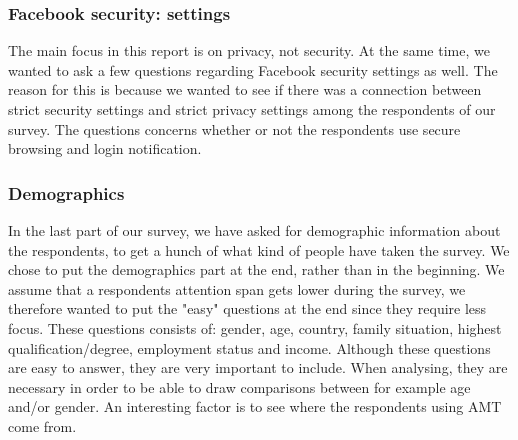 \subsubsection{Facebook security: settings}
The main focus in this report is on privacy, not security. At the same time, we wanted to ask a few questions regarding Facebook security settings as well. The reason for this is because we wanted to see if there was a connection between strict security settings and strict privacy settings among the respondents of our survey. The questions concerns whether or not the respondents use secure browsing and login notification.

\subsubsection{Demographics}
In the last part of our survey, we have asked for demographic information about the respondents, to get a hunch of what kind of people have taken the survey. We chose to put the demographics part at the end, rather than in the beginning. We assume that a respondents attention span gets lower during the survey, we therefore wanted to put the "easy" questions at the end since they require less focus. These questions consists of: gender, age, country, family situation, highest qualification/degree, employment status and income. Although these questions are easy to answer, they are very important to include. When analysing, they are necessary in order to be able to draw comparisons between for example age and/or gender. An interesting factor is to see where the respondents using AMT come from.  

